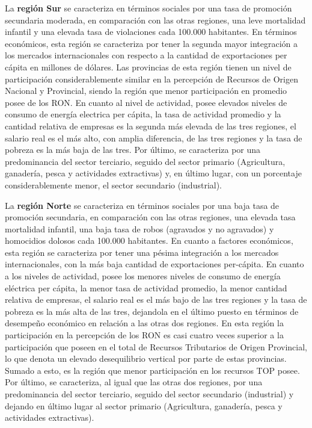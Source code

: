 \documentclass[12pt,a4paper]{article}
\begin{document}
La \textbf{región Sur} se caracteriza en términos sociales por una tasa de promoción secundaria moderada, en comparación con las otras regiones, una leve mortalidad infantil y una elevada tasa de violaciones cada 100.000 habitantes. En términos económicos, esta región se caracteriza por tener la segunda mayor integración a los mercados internacionales con respecto a la cantidad de exportaciones per cápita en millones de dólares. Las provincias de esta región tienen un nivel de participación considerablemente similar en la percepción de Recursos de Origen Nacional y Provincial, siendo la región que menor participación en promedio posee de los RON. En cuanto al nivel de actividad, posee elevados niveles de consumo  de energía electrica per cápita, la tasa de actividad promedio y la cantidad relativa de empresas es la segunda más elevada de las tres regiones, el salario real es el más alto, con amplia diferencia, de las tres regiones y la tasa de pobreza es la más baja de las tres. Por último, se caracteriza por una predominancia del sector terciario, seguido del sector primario (Agricultura, ganadería, pesca y actividades extractivas) y, en último lugar, con un porcentaje considerablemente menor, el sector secundario (industrial).

La \textbf{región Norte} se caracteriza en términos sociales por una baja tasa de promoción secundaria, en comparación con las otras regiones, una elevada tasa mortalidad infantil, una baja tasa de robos (agravados y no agravados) y homocidios dolosos cada 100.000 habitantes.
En cuanto a factores económicos, esta región se caracteriza por tener una pésima integración a los mercados internacionales, con la más baja cantidad de exportaciones per-cápita. En cuanto a los niveles de actividad, posee los menores niveles de consumo  de energía eléctrica per cápita, la menor tasa de actividad promedio, la menor cantidad relativa de empresas, el salario real es el más bajo de las tres regiones y la tasa de pobreza es la más alta de las tres, dejandola en el último puesto en términos de desempeño económico en relación a las otras dos regiones. 
En esta región la participación en la percepción de los RON es casi cuatro veces superior a la participación que poseen en el total de Recursos Tributarios de Origen Provincial, lo que denota un elevado desequilibrio vertical por parte de estas provincias. Sumado a esto, es la región que menor participación en los recursos TOP posee. Por último, se caracteriza, al igual que las otras dos regiones, por una predominancia del sector terciario, seguido del sector secundario (industrial) y dejando en último lugar al sector primario (Agricultura, ganadería, pesca y actividades extractivas).
\end{document}
